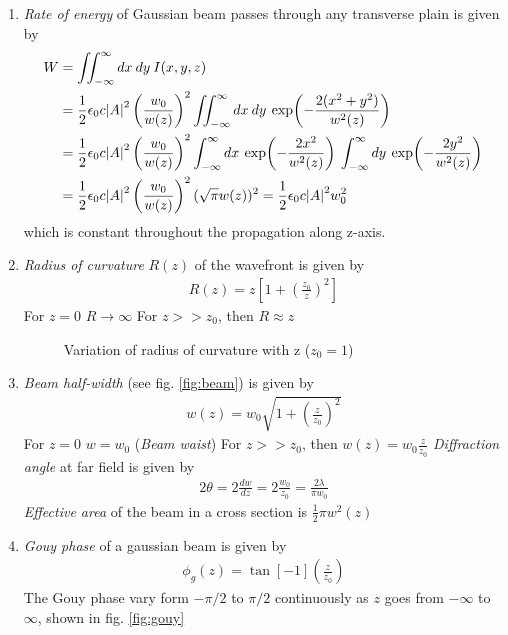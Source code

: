 \documentclass[11pt,a4paper]{article}
\numberwithin{equation}{section}
\begin{document}
\begin{enumerate}
	\item
	\textit{Rate of energy} of Gaussian beam passes through any transverse plain is given by
	\begin{align}
		W&= \iint_{-\infty}^{\infty} dx\:dy\:I(x,y,z)\nonumber\\
		&= \frac{1}{2} \epsilon_0c \abs{A}^2 \left(\frac{w_0}{w(z)}\right)^2 \iint_{-\infty}^{\infty} dx\:dy\: \exp(-\frac{2(x^2+y^2)}{w^2(z)}\nonumber)\\
		&= \frac{1}{2} \epsilon_0c \abs{A}^2 \left(\frac{w_0}{w(z)}\right)^2 \int_{-\infty}^{\infty} dx\: \exp(-\frac{2x^2}{w^2(z)})\: \int_{-\infty}^{\infty} dy\: \exp(-\frac{2y^2}{w^2(z)})\nonumber\\
		&=  \frac{1}{2}\epsilon_0c \abs{A}^2 \left(\frac{w_0}{w(z)}\right)^2 (\sqrt{\pi} w(z))^2 = \frac{1}{2}\epsilon_0c \abs{A}^2 w_0^2
	\end{align} which is constant throughout the propagation along z-axis.

	\item
	\textit{Radius of curvature} $R(z)$ of the wavefront is given by
	\begin{align}
		R(z)= z\left[1+\left(\frac{z_0}{z}\right)^2\right]
	\end{align}
	\subitem For $z=0$ $R\rightarrow\infty$
	\subitem For $z>>z_0$, then $R\approx z$
	
	\begin{figure}[H]
	\centering
	\scalebox{0.7}{}
	\caption{Variation of radius of curvature with z ($z_0=1$)}
	\label{fig:R vs z}
	\end{figure}
	
	\item
	\textit{Beam half-width} (see fig. \ref{fig:beam}) is given by 
	\begin{align}
		w(z)= w_0\sqrt{1+\left(\frac{z}{z_0}\right)^2}
	\end{align}
	\subitem For $z=0$ $w = w_0$ (\textit{Beam waist})
	\subitem For $z>>z_0$, then $w(z)= w_0\frac{z}{z_0}$
	\subitem \textit{Diffraction angle} at far field is given by 
	\begin{align}
		2\theta = 2\frac{dw}{dz} = 2\frac{w_0}{z_0} = \frac{2\lambda}{\pi w_0}
	\end{align}
	\subitem \textit{Effective area} of the beam in a cross section is $\displaystyle \frac{1}{2} \pi w^2(z)$
	
	\item 
	\textit{Gouy phase} of a gaussian beam is given by
	\begin{align}
		\phi_g (z) = \tan[-1](\frac{z}{z_0})
	\end{align}
	The Gouy phase vary form $-\pi/2$ to $\pi/2$ continuously as $z$ goes from $-\infty$ to $\infty$, shown in fig. \ref{fig:gouy}
	

\end{enumerate}
\end{document}
